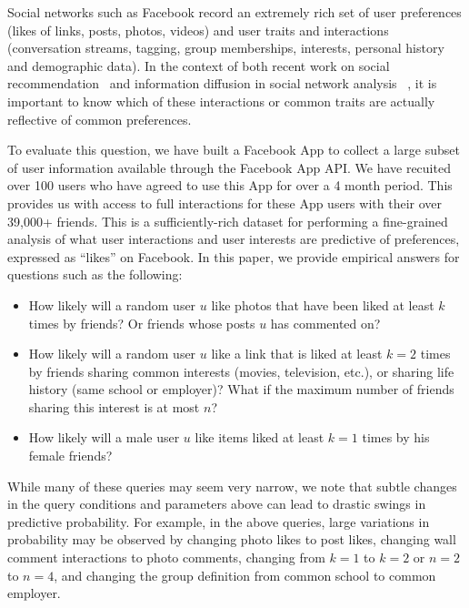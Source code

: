 \label{sec:introduction}

Social networks such as Facebook record an extremely rich set of user
preferences (likes of links, posts, photos, videos) and user traits
and interactions (conversation streams, tagging, group memberships,
interests, personal history and demographic data).  In the context of
both recent work on social recommendation~\cite{sorec,ste,lla} and
information diffusion in social network analysis
~\cite{lerman2010information,Romero2011hashtag,Bakshy2012chamber}, 
it is important to know which of these interactions or common traits
are actually reflective of common preferences.

To evaluate this question, we have built a Facebook App to collect a
large subset of user information available through the Facebook App
API. We have recuited over 100 users who have agreed to use this App for over a 4
month period.  This provides us with access to full interactions
for these App users with their over 39,000+ friends. This is a sufficiently-rich dataset
for  performing a fine-grained analysis of what user interactions
and user interests are predictive of preferences, 
expressed as ``likes'' on Facebook. In this paper,
we provide empirical answers for questions such as the following:
\begin{itemize}
\item How likely will a random user $u$ like
photos that have been liked at least $k$ times by friends? 
Or friends whose posts $u$ has commented on?
\item How likely will a random user $u$ like a
link that is liked at least $k=2$ times by friends sharing common interests
(movies, television, etc.), or sharing life history (same school or employer)? 
What if the maximum number of friends sharing this interest is at most $n$?
\item How likely will a male user $u$ like
items liked at least $k=1$ times by his female friends?
\end{itemize}

While many of these queries may seem very narrow, we note that subtle
changes in the query conditions and parameters above can lead to
drastic swings in predictive probability.  For example, in the above
queries, large variations in probability may be 
observed by changing photo likes to post likes, changing
wall comment interactions to photo comments, changing from $k=1$ to
$k=2$ or $n=2$ to $n=4$, and changing the group definition from common
school to common employer.

